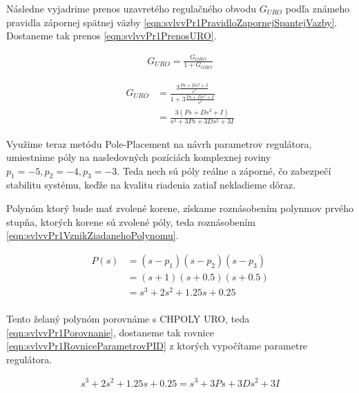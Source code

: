 	Následne vyjadrime prenos uzavretého regulačného obvodu $G_{URO}$ podľa známeho pravidla zápornej spätnej väzby \cref{eqn:svlvvPr1PravidloZapornejSpantejVazby}. Dostaneme tak prenos \cref{eqn:svlvvPr1PrenosURO}.
	
	\begin{equation}
			\begin{aligned}
			G_{URO} = \frac{G_{ORO}}{1 + G_{ORO}}
			\end{aligned}
			\label{eqn:svlvvPr1PravidloZapornejSpantejVazby}
	\end{equation}
	
	\begin{equation}
		\begin{aligned}
		G_{URO} &= \frac{3\frac{Ps + Ds^2 + I}{s^3}}{1 + 3\frac{Ps + Ds^2 + I}{s^3}}  \\
		 		&= \frac{3(Ps + Ds^2 + I)}{s^3 + 3Ps + 3Ds^2 + 3I}
		\end{aligned}
		\label{eqn:svlvvPr1PrenosURO}
	\end{equation}
	
	Využime teraz metódu Pole-Placement na návrh parametrov regulátora, umiestnime póly na nasledovných pozíciách komplexnej roviny $p_1 = -5, p_2 = -4, p_3 = -3$. Teda nech sú póly reálne a záporné, čo zabezpečí stabilitu systému, keďže na kvalitu riadenia zatiaľ nekladieme dôraz.
	
	Polynóm ktorý bude mať zvolené korene, získame roznásobením polynmov prvého stupňa, ktorých korene sú zvolené póly, teda roznásobením \cref{eqn:svlvvPr1VznikZiadanehoPolynomu}. 
	
		\begin{equation}
	\begin{aligned}
	P(s) &= (s - p_1)(s - p_2)(s - p_3) \\
		 &= (s + 1)(s + 0.5)(s + 0.5) \\
		 &= s^3 + 2s^2 + 1.25s + 0.25\\
	\end{aligned}
	\label{eqn:svlvvPr1VznikZiadanehoPolynomu}
	\end{equation}
	
	Tento želaný polynóm porovnáme s CHPOLY URO, teda \cref{eqn:svlvvPr1Porovnanie}, dostaneme tak rovnice \cref{eqn:svlvvPr1RovniceParametrovPID} z ktorých vypočítame parametre regulátora.
	
	\begin{equation}
	\begin{aligned}
		s^3 + 2s^2 + 1.25s + 0.25= s^3 + 3Ps + 3Ds^2 + 3I\\
	\end{aligned}
	\label{eqn:svlvvPr1Porovnanie}
	\end{equation}
	
